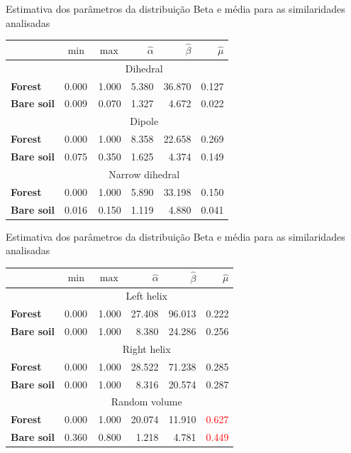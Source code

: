 \documentclass{beamer} %
\begin{document}
\begin{frame}{Estimativa dos parâmetros da distribuição Beta e média para as similaridades analisadas}
\begin{table}[hbt]
\centering
\begin{tabular}{lrrrrr}
\toprule
& $\min$ & $\max$ & $\widehat\alpha$ & $\widehat\beta$ & $\widehat\mu$\\ \midrule
& \multicolumn{5}{c}{Dihedral}\\
\cmidrule(lr){2-6}
\textbf{Forest} & 0.000 & 1.000 & 5.380 & 36.870 & 0.127\\
\textbf{Bare soil} & 0.009 & 0.070 & 1.327 & 4.672 & 0.022\\
\midrule
%
& \multicolumn{5}{c}{Dipole}\\
\cmidrule(lr){2-6}
\textbf{Forest} & 0.000 & 1.000 & 8.358 & 22.658 & 0.269\\
\textbf{Bare soil} & 0.075 & 0.350 & 1.625 & 4.374 & 0.149\\
\midrule
%
& \multicolumn{5}{c}{Narrow dihedral}\\
\cmidrule(lr){2-6}
\textbf{Forest} & 0.000 & 1.000 & 5.890 & 33.198 & 0.150\\
\textbf{Bare soil} & 0.016 & 0.150 & 1.119 & 4.880 & 0.041\\
\bottomrule
\end{tabular}
\end{table}
\end{frame}

\begin{frame}{Estimativa dos parâmetros da distribuição Beta e média para as similaridades analisadas}
\begin{table}[hbt]
\centering
\begin{tabular}{lrrrrr}
\toprule
& $\min$ & $\max$ & $\widehat\alpha$ & $\widehat\beta$ & $\widehat\mu$\\ \midrule
& \multicolumn{5}{c}{Left helix}\\
\cmidrule(lr){2-6}
\textbf{Forest} & 0.000 & 1.000 & 27.408 & 96.013 & 0.222\\
\textbf{Bare soil} & 0.000 & 1.000 & 8.380 & 24.286 & 0.256\\
\midrule
& \multicolumn{5}{c}{Right helix}\\
\cmidrule(lr){2-6}
\textbf{Forest} & 0.000 & 1.000 & 28.522 & 71.238 & 0.285\\
\textbf{Bare soil} & 0.000 & 1.000 & 8.316 & 20.574 & 0.287\\
\midrule
%
& \multicolumn{5}{c}{Random volume}\\
\cmidrule(lr){2-6}
\textbf{Forest} & 0.000 & 1.000 & 20.074 & 11.910 & \textcolor{red}{0.627}\\
\textbf{Bare soil} & 0.360 & 0.800 & 1.218 & 4.781 & \textcolor{red}{0.449}\\
\bottomrule
\end{tabular}
\end{table}
\end{frame}
\end{document}
